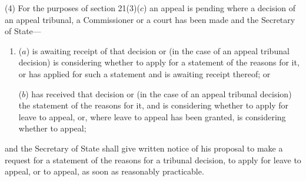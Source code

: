 \documentclass[12pt,a4paper]{article}
\begin{document}
(4) For the purposes of section 21(3)($c$)  an appeal is pending where a decision of an appeal tribunal, a Commissioner or a court has been made and the Secretary of State—
\begin{enumerate}\item[]
($a$) is awaiting receipt of that decision or (in the case of an appeal tribunal decision) is considering whether to apply for a statement of the reasons for it, or has applied for such a statement and is awaiting receipt thereof; or

($b$) has received that decision or (in the case of an appeal tribunal decision) the statement of the reasons for it, and is considering whether to apply for leave to appeal, or, where leave to appeal has been granted, is considering whether to appeal;
\end{enumerate}
and the Secretary of State shall give written notice of his proposal to make a request for a statement of the reasons for a tribunal decision, to apply for leave to appeal, or to appeal, as soon as reasonably practicable.

\end{document}
